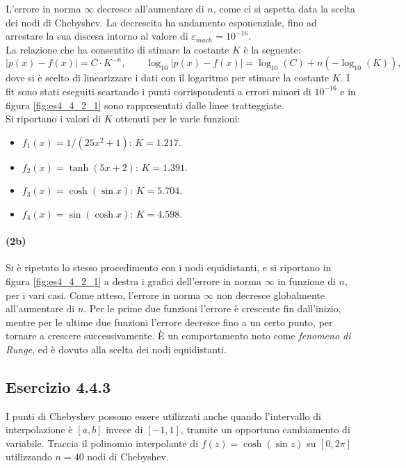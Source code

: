 \documentclass[letterpaper, 12pt]{article}
\numberwithin{equation}{section}    %
\begin{document}
L'errore in norma $\infty$ decresce all'aumentare di $n$,
come ci si aspetta data la scelta dei nodi di Chebyshev. La decrescita ha andamento esponenziale, 
fino ad arrestare la sua discesa intorno al valore di $\varepsilon_{mach} = 10^{-16}$. \\
La relazione che ha consentito di stimare la costante $K$ è la seguente:
\begin{equation}
    |p(x)-f(x)| = C \cdot K^{-n}, \qquad \log_{10}|p(x)-f(x)| = \log_{10}(C) + n(-\log_{10}(K)),
\end{equation}
dove si è scelto di linearizzare i dati con il logaritmo per stimare la costante $K$. 
I fit sono stati eseguiti scartando i punti corrispondenti
a errori minori di $10^{-16}$ e in figura \ref{fig:es4_4_2_1} sono rappresentati dalle linee tratteggiate. \\
Si riportano i valori di $K$ ottenuti per le varie funzioni:
\begin{itemize}
    \item $f_1(x) = 1/(25x^2+1)$: $K = 1.217$.
    \item $f_2(x) = \tanh(5 x+2)$: $K = 1.391$.
    \item $f_3(x) = \cosh(\sin x)$: $K = 5.704$.
    \item $f_4(x) = \sin(\cosh x)$: $K = 4.598$.
\end{itemize}

\paragraph{(2b)}Si è ripetuto lo stesso procedimento con i nodi equidistanti, e si riportano in 
figura \ref{fig:es4_4_2_1} a destra
i grafici dell'errore in norma $\infty$ in funzione di $n$, per i vari casi.
Come atteso, l'errore in norma $\infty$ non decresce globalmente all'aumentare di $n$. Per le prime due funzioni
l'errore è crescente fin dall'inizio, mentre per le ultime due funzioni l'errore decresce fino a un certo punto, 
per tornare a crescere successivamente. È un comportamento noto come \textit{fenomeno di Runge}, ed è 
dovuto alla scelta dei nodi equidistanti. \\ 

\subsection{Esercizio 4.4.3}
I punti di Chebyshev possono essere utilizzati anche quando l'intervallo di interpolazione è $[a,b]$ 
invece di $[-1,1]$, tramite un opportuno cambiamento di variabile. 
Traccia il polinomio interpolante di $f(z) = \cosh(\sin z)$ su $[0,2\pi]$ utilizzando $n=40$ nodi di Chebyshev.
\end{document}
